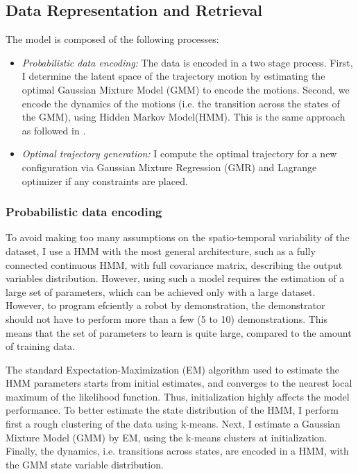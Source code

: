 \documentclass[conference]{IEEEtran}
\begin{document}
\subsection{Data Representation and Retrieval}
The model is composed of the following processes:
\begin{itemize}
\item{
    \emph{Probabilistic data encoding:} The data is encoded in a two stage process. First, I determine the latent space of the trajectory motion by estimating the optimal Gaussian Mixture Model (GMM) to encode the motions. Second, we encode the dynamics of the motions (i.e. the transition across the states of the GMM), using Hidden Markov Model(HMM). This is the same approach as followed in \cite{ref:7}.
}    
\item{
    \emph{Optimal trajectory generation:} I compute the optimal trajectory for a new configuration via Gaussian Mixture Regression (GMR) and Lagrange optimizer if any constraints are placed.
}    
\end{itemize}

\subsubsection{Probabilistic data encoding}
To avoid making too many assumptions on the spatio-temporal variability of the dataset, I use a HMM with the most general architecture, such as a fully connected continuous HMM, with full covariance matrix, describing the output variables distribution. However, using such a model requires the estimation of a large set of parameters, which can be achieved only with a large dataset. However, to program efciently a robot by demonstration, the demonstrator should not have to perform more than a few (5 to 10) demonstrations. This means that the set of parameters to learn is quite large, compared to the amount of training data. 

The standard Expectation-Maximization (EM) algorithm used to estimate the HMM parameters starts from initial estimates, and converges to the nearest local maximum of the likelihood function. Thus, initialization highly affects the model performance. To better estimate the state distribution of the HMM, I perform first a rough clustering of the data using k-means. Next, I estimate a Gaussian Mixture Model (GMM) by EM, using the k-means clusters at initialization. Finally, the dynamics, i.e. transitions across states, are encoded in a HMM, with the GMM state variable distribution.
\end{document}

